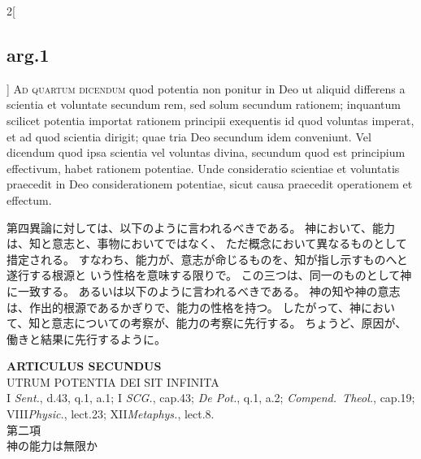 \documentclass[paper=a4paper,fontsize=10pt,jafontsize=9pt,titlepage]{jlreq}
\begin{document}
\begin{paracol}{2}[\subsection{arg.1}]
{\scshape Ad quartum dicendum} quod potentia non ponitur
in Deo ut aliquid differens a scientia et voluntate secundum rem, sed
solum secundum rationem; inquantum scilicet potentia importat rationem
principii exequentis id quod voluntas imperat, et ad quod scientia
dirigit; quae tria Deo secundum idem conveniunt. Vel dicendum quod ipsa
scientia vel voluntas divina, secundum quod est principium effectivum,
habet rationem potentiae. Unde consideratio scientiae et voluntatis
praecedit in Deo considerationem potentiae, sicut causa praecedit
operationem et effectum.

\switchcolumn

第四異論に対しては、以下のように言われるべきである。
神において、能力は、知と意志と、事物においてではなく、
ただ概念において異なるものとして措定される。
すなわち、能力が、意志が命じるものを、知が指し示すものへと遂行する根源と
 いう性格を意味する限りで。
この三つは、同一のものとして神に一致する。
あるいは以下のように言われるべきである。
神の知や神の意志は、作出的根源であるかぎりで、能力の性格を持つ。
したがって、神において、知と意志についての考察が、能力の考察に先行する。
ちょうど、原因が、働きと結果に先行するように。

\end{paracol}
\newpage
{}
{}
\setcounter{section}{2}
\setcounter{subsection}{0}




\begin{center}
 {\Large {\bfseries ARTICULUS SECUNDUS}}\\
 {\large UTRUM POTENTIA DEI SIT INFINITA}\\
 {\footnotesize I {\itshape Sent.}, d.43, q.1, a.1; I {\itshape SCG.}, cap.43; {\itshape De Pot.}, q.1, a.2; {\itshape Compend.~Theol.}, cap.19; VIII{\itshape Physic.}, lect.23; XII{\itshape Metaphys.}, lect.8.}\\
 {\Large 第二項\\神の能力は無限か}
\end{center}
\end{document}

